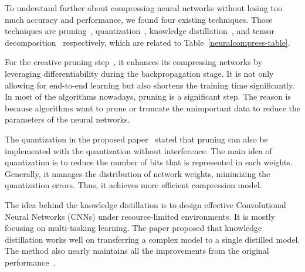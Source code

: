 \documentclass{article}
\begin{document}

To understand further about compressing neural networks without losing too much accuracy and performance, we found four existing techniques. Those techniques are pruning~\cite{cheng2020survey}, quantization~\cite{pal2020autoencoding}, knowledge distillation~\cite{gol2021control}, and tensor decomposition~\cite{pal2020autoencoding} respectively, which are related to Table~\ref{neuralcompress-table}. 

For the creative pruning step~\cite{cheng2020survey}, it enhances its compressing networks by leveraging differentiability during the backpropagation stage. It is not only allowing for end-to-end learning but also shortens the training time significantly. In most of the algorithms nowadays, pruning is a significant step. The reason is because algorithms want to prune or truncate the unimportant data to reduce the parameters of the neural networks. 

The quantization in the proposed paper~\cite{pal2020autoencoding} stated that pruning can also be implemented with the quantization without interference. The main idea of quantization is to reduce the number of bits that is represented in each weights. Generally, it manages the distribution of network weights, minimizing the quantization errors. Thus, it achieves more efficient compression model. 

The idea behind the knowledge distillation is to design effective Convolutional Neural Networks (CNNs) under resource-limited environments. It is mostly focusing on multi-tasking learning. The paper proposed that knowledge distillation works well on transferring a complex model to a single distilled model. The method also nearly maintains all the improvements from the original performance~\cite{gol2021control}. 
\end{document}
